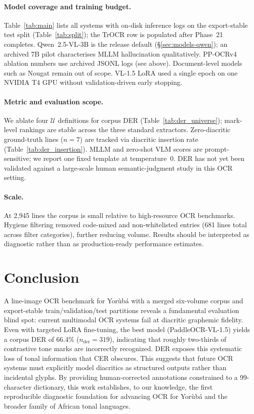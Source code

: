 \documentclass{article}
\newcommand{\Yoruba}{Yor\`ub\'a}
\begin{document}
\paragraph{Model coverage and training budget.}
Table~\ref{tab:main} lists all systems with on-disk inference logs on the export-stable test split (Table~\ref{tab:split}); the TrOCR row is populated after Phase~21 completes. Qwen~2.5-VL-3B is the release default (\S\ref{sec:models-qwen}); an archived 7B pilot characterises MLLM hallucination qualitatively. PP-OCRv4 ablation numbers use archived JSONL logs (see above). Document-level models such as Nougat remain out of scope. VL-1.5 LoRA used a single epoch on one NVIDIA T4 GPU without validation-driven early stopping.

\paragraph{Metric and evaluation scope.}
We ablate four $\mathcal{U}$ definitions for corpus DER (Table~\ref{tab:der_universe}); mark-level rankings are stable across the three standard extractors. Zero-diacritic ground-truth lines ($n{=}7$) are tracked via diacritic insertion rate (Table~\ref{tab:der_insertion}). MLLM and zero-shot VLM scores are prompt-sensitive; we report one fixed template at temperature~0. DER has not yet been validated against a large-scale human semantic-judgment study in this OCR setting.

\paragraph{Scale.}
At 2{,}945 lines the corpus is small relative to high-resource OCR benchmarks. Hygiene filtering removed code-mixed and non-whitelisted entries (681 lines total across filter categories), further reducing volume. Results should be interpreted as diagnostic rather than as production-ready performance estimates.

\section{Conclusion}

A line-image OCR benchmark for \Yoruba{} with a merged six-volume corpus and export-stable train/validation/test partitions reveals a fundamental evaluation blind spot: current multimodal OCR systems fail at diacritic graphemic fidelity. Even with targeted LoRA fine-tuning, the best model (PaddleOCR-VL-1.5) yields a corpus DER of 66.4\% ($n_{\mathrm{der}}{=}319$), indicating that roughly two-thirds of contrastive tone marks are incorrectly recognized. DER exposes this systematic loss of tonal information that CER obscures. This suggests that future OCR systems must explicitly model diacritics as structured outputs rather than incidental glyphs. By providing human-corrected annotations constrained to a 99-character dictionary, this work establishes, to our knowledge, the first reproducible diagnostic foundation for advancing OCR for \Yoruba{} and the broader family of African tonal languages.
\end{document}
